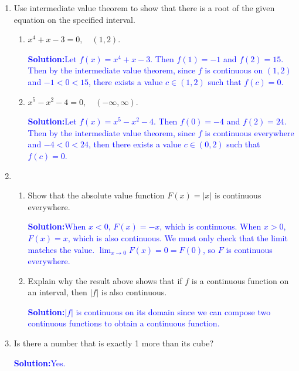 \documentclass[letterpaper,11pt]{article}
\newcommand{\sol}[2]{\begin{minipage}[c][#1]{\linewidth}{\textcolor{blue}{\textbf{Solution:}}\quad \textcolor{blue}{#2}}\end{minipage}}
\newcommand{\sol}[2]{\begin{minipage}[c][#1]{\linewidth}{\vfill}\end{minipage}}
\begin{document}
\begin{enumerate}
    \item Use intermediate value theorem to show that there is a root of the given equation on the specified interval.
    \begin{enumerate}[label = \alph*.]
        \item $x^4 + x-3=0, \quad (1,2)$.
        
        \sol{.5in}{Let $f(x) = x^4 + x - 3$. Then $f(1) = -1$ and $f(2) = 15$. Then by the intermediate value theorem, since $f$ is continuous on $(1,2)$ and $-1 < 0 < 15$, there exists a value $c \in (1,2)$ such that $f(c) = 0$.}
        \vfill
        \item $x^5 - x^2 - 4 = 0, \quad (-\infty,\infty)$.

        \sol{.5in}{Let $f(x) = x^5 - x^2 - 4$. Then $f(0) = -4$ and $f(2) = 24$. Then by the intermediate value theorem, since $f$ is continuous everywhere and $-4 < 0 < 24$, then there exists a value $c\in (0,2)$ such that $f(c) = 0$.}
        \vfill
    \end{enumerate}

    \newpage

    \item \begin{enumerate}[label = \alph*.]
        \item Show that the absolute value function $F(x) = |x|$ is continuous everywhere.

        \sol{0.5in}{When $x < 0$, $F(x) = -x$, which is continuous. When $x > 0$, $F(x) = x$, which is also continuous. We must only check that the limit matches the value. $\lim_{x\to 0} F(x) = 0 = F(0)$, so $F$ is continuous everywhere.}
        \vfill
        \item Explain why the result above shows that if $f$ is a continuous function on an interval, then $|f|$ is also continuous.

        \sol{0.5in}{$|f|$ is continuous on its domain since we can compose two continuous functions to obtain a continuous function.}
        \vfill
    \end{enumerate}
    
    \item Is there a number that is exactly 1 more than its cube?
    
    \sol{0.5in}{Yes.}
    \vfill
\end{enumerate}
\end{document}
